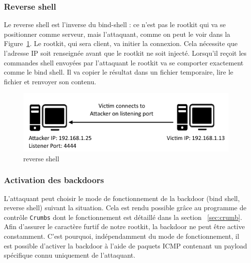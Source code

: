 \documentclass[12pt]{article}
\begin{document}
        \subsubsection{Reverse shell}
            
            Le reverse shell est l'inverse du bind-shell : ce n'est pas le rootkit qui va se positionner comme serveur, mais l'attaquant, comme on peut le voir dans la Figure~\ref{figure:3}. Le rootkit, qui sera client, va initier la connexion. Cela nécessite que l'adresse IP soit renseignée avant que le rootkit ne soit injecté. Lorsqu'il reçoit les commandes shell envoyées par l'attaquant le rootkit va se comporter exactement comme le bind shell. Il va copier le résultat dans un fichier temporaire, lire le fichier et renvoyer son contenu.
            
\begin{figure}[H] 
\begin{center}
\includegraphics{./img/reverse-shell.png}

\caption[dsfsdf]{reverse shell}
\label{figure:3}
\end{center}
\end{figure}
            
        \subsubsection{Activation des backdoors}
            
            L'attaquant peut choisir le mode de fonctionnement de la backdoor (bind shell, reverse shell) suivant la situation. Cela est rendu possible grâce au programme de contrôle \texttt{Crumbs} dont le fonctionnement est détaillé dans la section ~\ref{sec:crumb}. 
			Afin d'assurer le caractère furtif de notre rootkit, la backdoor ne peut être active constamment. C'est pourquoi, indépendamment du mode de fonctionnement, il est possible d'activer la backdoor à l'aide de paquets ICMP contenant un payload spécifique connu uniquement de l'attaquant.
            
\end{document}
